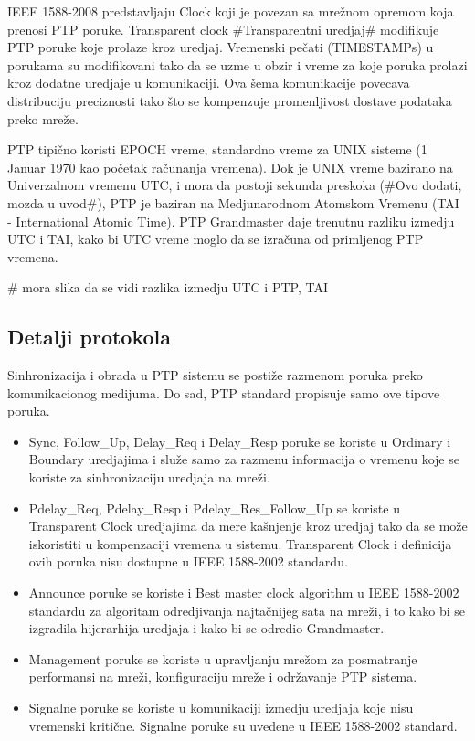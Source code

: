 \documentclass[a4paper,12pt, master]{etf}
\begin{document}
	IEEE 1588-2008 predstavljaju Clock koji je povezan sa mre\v{z}nom opremom koja prenosi PTP
	poruke.	Transparent clock \#Transparentni uredjaj\# modifikuje PTP poruke koje prolaze
	kroz uredjaj. Vremenski pe\v{c}ati (TIMESTAMPs) u porukama su modifikovani tako da se uzme u
	obzir i vreme za koje poruka prolazi kroz dodatne uredjaje u komunikaciji. Ova \v{s}ema
	komunikacije povecava distribuciju preciznosti tako \v{s}to se kompenzuje promenljivost
	dostave podataka preko mre\v{z}e.

	PTP tipi\v{c}no koristi EPOCH vreme, standardno vreme za UNIX sisteme (1 Januar 1970 kao
        po\v{c}etak	ra\v{c}unanja vremena). Dok je UNIX vreme bazirano na Univerzalnom vremenu UTC,
        i mora da postoji sekunda preskoka (\#Ovo dodati, mozda u uvod\#), PTP je baziran na
	Medjunarodnom Atomskom Vremenu (TAI - International Atomic Time). PTP Grandmaster daje
	trenutnu razliku izmedju UTC i TAI,	kako bi UTC vreme moglo da se izra\v{c}una od primljenog
	PTP vremena.

	\# mora slika da se vidi razlika izmedju UTC i PTP, TAI

        \subsection{Detalji protokola}

	Sinhronizacija i obrada u PTP sistemu se posti\v{z}e razmenom poruka preko komunikacionog
	medijuma. Do sad, PTP standard propisuje samo ove tipove poruka.

        \begin{itemize}
	    \item Sync, Follow\_Up, Delay\_Req i Delay\_Resp poruke se koriste u Ordinary i Boundary
	    uredjajima i slu\v{z}e samo za razmenu informacija o vremenu koje se koriste za
	    sinhronizaciju uredjaja na mre\v{z}i.
	    \item Pdelay\_Req, Pdelay\_Resp i Pdelay\_Res\_Follow\_Up se koriste u Transparent Clock
	    uredjajima da mere ka\v{s}njenje kroz uredjaj tako da se mo\v{z}e iskoristiti u kompenzaciji
	    vremena u sistemu. Transparent Clock i definicija ovih poruka nisu dostupne u IEEE
	    1588-2002 standardu.
	    \item Announce poruke se koriste i Best master clock algorithm u IEEE 1588-2002 standardu za
	    algoritam odredjivanja najta\v{c}nijeg sata na mre\v{z}i, i to kako bi se izgradila hijerarhija
	    uredjaja i kako bi se odredio Grandmaster.
            \item Management poruke se koriste u upravljanju mre\v{z}om za posmatranje performansi na
            mre\v{z}i, konfiguraciju mre\v{z}e i odr\v{z}avanje PTP sistema.
	    \item Signalne poruke se koriste u komunikaciji izmedju uredjaja koje nisu vremenski kriti\v{c}ne.
            Signalne poruke su uvedene u IEEE 1588-2002 standard.
        \end{itemize}
\end{document}
